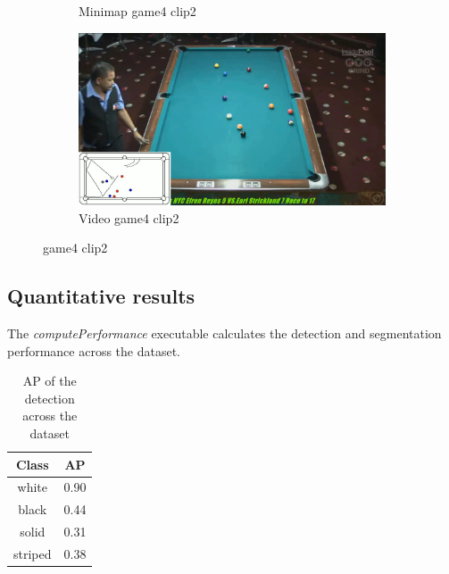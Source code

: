 \begin{figure}[H]
\begin{subfigure}[b]{0.48\textwidth}
    	\caption{Minimap game4 clip2}
    	\label{fig: game4_clip2_minimap}
    \end{subfigure}
    \begin{subfigure}[b]{0.48\textwidth}
    	\centering
    	\includegraphics[width=\textwidth]{images/Video/game4_clip2_video.jpg}
    	\caption{Video game4 clip2}
    	\label{fig: game1_clip1_video}
    \end{subfigure}

	\caption{game4 clip2}
\end{figure}


\subsection{Quantitative results}
The \textit{computePerformance} executable calculates the detection and segmentation performance across the dataset.
\begin{table}[H]
	\centering
    \begin{tabular}{|c|c|}
        \hline
        \textbf{Class} & \textbf{AP} \\
        \hline
        white & 0.90 \\
        \hline
        black & 0.44 \\
        \hline
        solid & 0.31 \\
        \hline
        striped & 0.38 \\
        \hline
    \end{tabular}
    \caption{AP of the detection across the dataset}
    \label{tab: AP across dataset}
\end{table}

